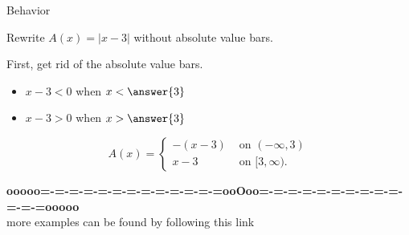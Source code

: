\documentclass{ximera}
\begin{document}
\begin{example}  Behavior


Rewrite $A(x) = | x - 3|$ without absolute value bars.



\begin{explanation}


First, get rid of the absolute value bars.

\begin{itemize}
\item $x - 3 < 0$ when $x < \answer{3}$
\item $x - 3 > 0$ when $x > \answer{3}$
\end{itemize}



\[
A(x) = 
\begin{cases}
  -(x - 3) & \text{ on } (-\infty, 3)   \\
  x - 3  & \text{ on } [3, \infty).
\end{cases}
\]






\end{explanation}


\end{example}


















\begin{center}
\textbf{\textcolor{green!50!black}{ooooo=-=-=-=-=-=-=-=-=-=-=-=-=ooOoo=-=-=-=-=-=-=-=-=-=-=-=-=ooooo}} \\

more examples can be found by following this link\\ 

\end{center}
\end{document}
